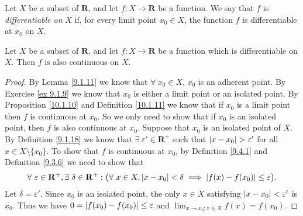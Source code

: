 \begin{definition}\label{10.1.11}
    Let \(X\) be a subset of \(\mathbf{R}\), and let \(f : X \to \mathbf{R}\) be a function.
    We say that \(f\) is \emph{differentiable on} \(X\) if, for every limit point \(x_0 \in X\), the function \(f\) is differentiable at \(x_0\) on \(X\).
\end{definition}

\begin{corollary}\label{10.1.12}
    Let \(X\) be a subset of \(\mathbf{R}\), and let \(f : X \to \mathbf{R}\) be a function which is differentiable on \(X\).
    Then \(f\) is also continuous on \(X\).
\end{corollary}

\begin{proof}
    By Lemma \ref{9.1.11} we know that \(\forall\ x_0 \in X\), \(x_0\) is an adherent point.
    By Exercise \ref{ex 9.1.9} we know that \(x_0\) is either a limit point or an isolated point.
    By Proposition \ref{10.1.10} and Definition \ref{10.1.11} we know that if \(x_0\) is a limit point then \(f\) is continuous at \(x_0\).
    So we only need to show that if \(x_0\) is an isolated point, then \(f\) is also continuous at \(x_0\).
    Suppose that \(x_0\) is an isolated point of \(X\).
    By Definition \ref{9.1.18} we know that \(\exists\ \varepsilon' \in \mathbf{R}^+\) such that \(\abs*{x - x_0} > \varepsilon'\) for all \(x \in X \setminus \{x_0\}\).
    To show that \(f\) is continuous at \(x_0\), by Definition \ref{9.4.1} and Definition \ref{9.3.6} we need to show that
    \[
        \forall\ \varepsilon \in \mathbf{R}^+, \exists\ \delta \in \mathbf{R}^+ : \big(\forall\ x \in X, \abs*{x - x_0} < \delta \implies \abs*{f(x) - f(x_0)} \leq \varepsilon\big).
    \]
    Let \(\delta = \varepsilon'\).
    Since \(x_0\) is an isolated point, the only \(x \in X\) satisfying \(\abs*{x - x_0} < \varepsilon'\) is \(x_0\).
    Thus we have \(0 = \abs*{f(x_0) - f(x_0)} \leq \varepsilon\) and \(\lim_{x \to x_0 ; x \in X} f(x) = f(x_0)\).
\end{proof}

